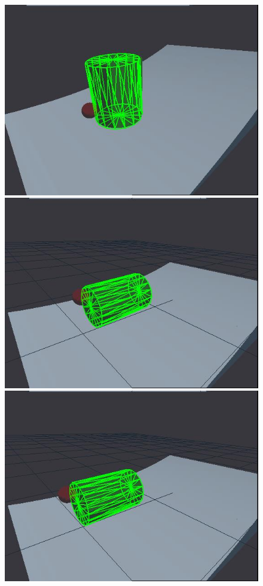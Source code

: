 \begin{figure}[htbp]
{}
\centerline{
\includegraphics[width=\imgwid]{./A00100}
\includegraphics[width=\imgwid]{./B00350}
\includegraphics[width=\imgwid]{./C01000}
}
\end{figure}
